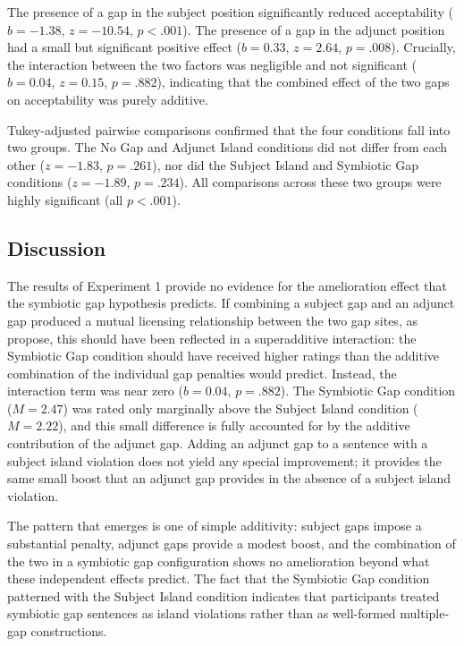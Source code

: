 \documentclass[12pt]{article}
\begin{document}
The presence of a gap in the subject position significantly reduced acceptability ($b = -1.38$, $z = -10.54$, $p < .001$). The presence of a gap in the adjunct position had a small but significant positive effect ($b = 0.33$, $z = 2.64$, $p = .008$). Crucially, the interaction between the two factors was negligible and not significant ($b = 0.04$, $z = 0.15$, $p = .882$), indicating that the combined effect of the two gaps on acceptability was purely additive.

Tukey-adjusted pairwise comparisons confirmed that the four conditions fall into two groups. The No Gap and Adjunct Island conditions did not differ from each other ($z = -1.83$, $p = .261$), nor did the Subject Island and Symbiotic Gap conditions ($z = -1.89$, $p = .234$). All comparisons across these two groups were highly significant (all $p < .001$).

\FloatBarrier
\subsection{Discussion}\label{sec:exp-discussion}

The results of Experiment 1 provide no evidence for the amelioration effect that the symbiotic gap hypothesis predicts. If combining a subject gap and an adjunct gap produced a mutual licensing relationship between the two gap sites, as \citeauthor{levine2003} propose, this should have been reflected in a superadditive interaction: the Symbiotic Gap condition should have received higher ratings than the additive combination of the individual gap penalties would predict. Instead, the interaction term was near zero ($b = 0.04$, $p = .882$). The Symbiotic Gap condition ($M = 2.47$) was rated only marginally above the Subject Island condition ($M = 2.22$), and this small difference is fully accounted for by the additive contribution of the adjunct gap. Adding an adjunct gap to a sentence with a subject island violation does not yield any special improvement; it provides the same small boost that an adjunct gap provides in the absence of a subject island violation.

The pattern that emerges is one of simple additivity: subject gaps impose a substantial penalty, adjunct gaps provide a modest boost, and the combination of the two in a symbiotic gap configuration shows no amelioration beyond what these independent effects predict. The fact that the Symbiotic Gap condition patterned with the Subject Island condition indicates that participants treated symbiotic gap sentences as island violations rather than as well-formed multiple-gap constructions.
\end{document}
